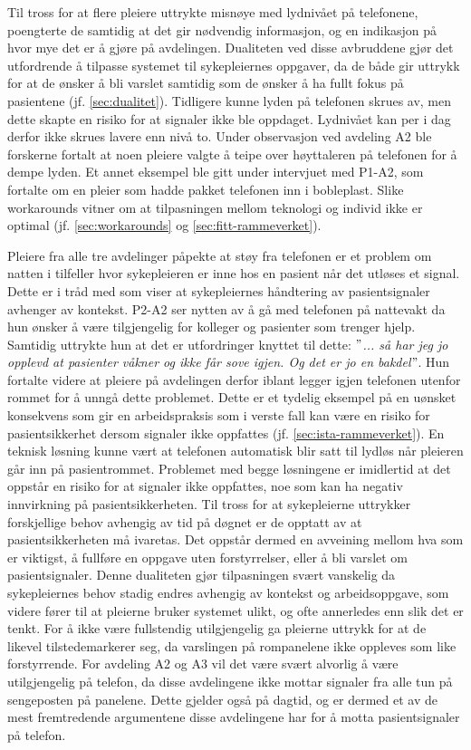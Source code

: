 \noindent
Til tross for at flere pleiere uttrykte misnøye med lydnivået på telefonene, poengterte de samtidig at det gir nødvendig informasjon, og en indikasjon på hvor mye det er å gjøre på avdelingen. Dualiteten ved disse avbruddene gjør det utfordrende å tilpasse systemet til sykepleiernes oppgaver, da de både gir uttrykk for at de ønsker å bli varslet samtidig som de ønsker å ha fullt fokus på pasientene (jf. \ref{sec:dualitet}). Tidligere kunne lyden på telefonen skrues av, men dette skapte en risiko for at signaler ikke ble oppdaget. Lydnivået kan per i dag derfor ikke skrues lavere enn nivå to. Under observasjon ved avdeling A2 ble forskerne fortalt at noen pleiere valgte å teipe over høyttaleren på telefonen for å dempe lyden. Et annet eksempel ble gitt under intervjuet med P1-A2, som fortalte om en pleier som hadde pakket telefonen inn i bobleplast. Slike workarounds vitner om at tilpasningen mellom teknologi og individ ikke er optimal (jf. \ref{sec:workarounds} og \ref{sec:fitt-rammeverket}).

\noindent
Pleiere fra alle tre avdelinger påpekte at støy fra telefonen er et problem om natten i tilfeller hvor sykepleieren er inne hos en pasient når det utløses et signal. Dette er i tråd med \citet{klemets13} som viser at sykepleiernes håndtering av pasientsignaler avhenger av kontekst. P2-A2 ser nytten av å gå med telefonen på nattevakt da hun ønsker å være tilgjengelig for kolleger og pasienter som trenger hjelp. Samtidig uttrykte hun at det er utfordringer knyttet til dette: \textit{ $"$... så har jeg jo opplevd at pasienter våkner og ikke får sove igjen. Og det er jo en bakdel$"$}. Hun fortalte videre at pleiere på avdelingen derfor iblant legger igjen telefonen utenfor rommet for å unngå dette problemet. Dette er et tydelig eksempel på en uønsket konsekvens som gir en arbeidspraksis som i verste fall kan være en risiko for pasientsikkerhet dersom signaler ikke oppfattes (jf. \ref{sec:ista-rammeverket}). En teknisk løsning kunne vært at telefonen automatisk blir satt til lydløs når pleieren går inn på pasientrommet. Problemet med begge løsningene er imidlertid at det oppstår en risiko for at signaler ikke oppfattes, noe som kan ha negativ innvirkning på pasientsikkerheten. Til tross for at sykepleierne uttrykker forskjellige behov avhengig av tid på døgnet er de opptatt av at pasientsikkerheten må ivaretas. Det oppstår dermed en avveining mellom hva som er viktigst, å fullføre en oppgave uten forstyrrelser, eller å bli varslet om pasientsignaler. Denne dualiteten gjør tilpasningen svært vanskelig da sykepleiernes behov stadig endres avhengig av kontekst og arbeidsoppgave, som videre fører til at pleierne bruker systemet ulikt, og ofte annerledes enn slik det er tenkt. For å ikke være fullstendig utilgjengelig ga pleierne uttrykk for at de likevel tilstedemarkerer seg, da varslingen på rompanelene ikke oppleves som like forstyrrende. For avdeling A2 og A3 vil det være svært alvorlig å være utilgjengelig på telefon, da disse avdelingene ikke mottar signaler fra alle tun på sengeposten på panelene. Dette gjelder også på dagtid, og er dermed et av de mest fremtredende argumentene disse avdelingene har for å motta pasientsignaler på telefon. 

